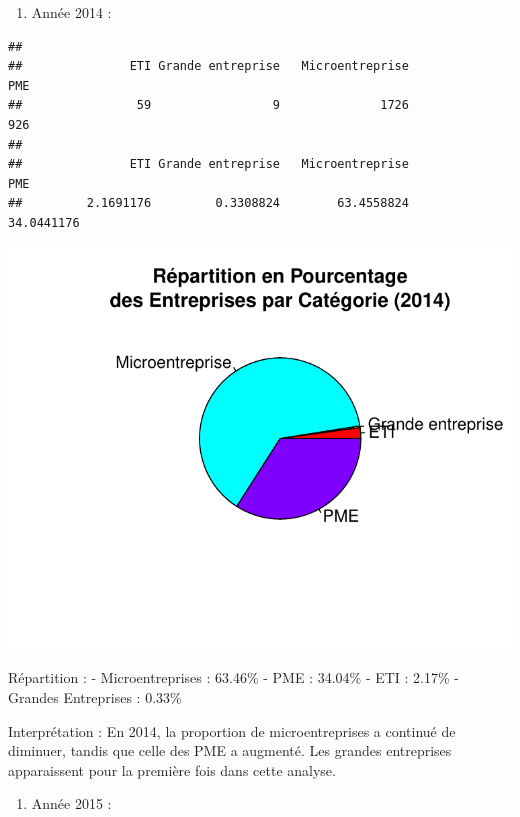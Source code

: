 \documentclass[mstat,12pt]{unswthesis}
\begin{document}
\medskip

\begin{enumerate}
\def\labelenumi{\arabic{enumi})}
\setcounter{enumi}{2}
\tightlist
\item
  Année 2014 :
\end{enumerate}

\begin{verbatim}
## 
##               ETI Grande entreprise   Microentreprise               PME 
##                59                 9              1726               926 
## 
##               ETI Grande entreprise   Microentreprise               PME 
##         2.1691176         0.3308824        63.4558824        34.0441176
\end{verbatim}

\includegraphics{TDDT_projet_L_2_files/figure-latex/analyse_univariee_2014-1.pdf}

Répartition : - Microentreprises : 63.46\% - PME : 34.04\% - ETI :
2.17\% - Grandes Entreprises : 0.33\%

\medskip

Interprétation : En 2014, la proportion de microentreprises a continué
de diminuer, tandis que celle des PME a augmenté. Les grandes
entreprises apparaissent pour la première fois dans cette analyse.

\medskip

\begin{enumerate}
\def\labelenumi{\arabic{enumi})}
\setcounter{enumi}{3}
\tightlist
\item
  Année 2015 :
\end{enumerate}
\end{document}
